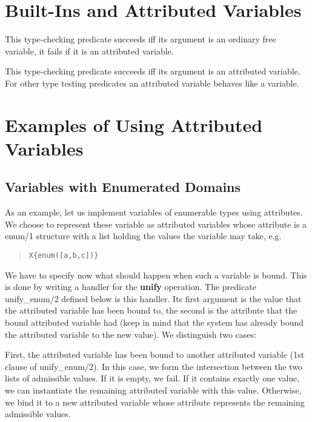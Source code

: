 \section{Built-Ins and Attributed Variables}
\begin{description}
\item[free(?Term)]
This type-checking predicate succeeds iff its argument is an
ordinary free variable, it fails if it is an attributed variable.

\item[meta(?Term)]
This type-checking predicate succeeds iff its argument is an attributed variable.
For other type testing predicates an attributed variable behaves like a variable.

\end{description}

\section{Examples of Using Attributed Variables}
\subsection{Variables with Enumerated Domains}
As an example, let us implement variables of enumerable types
using attributes.
We choose to represent these variable as attributed variables
whose attribute is
a enum/1 structure with a list holding the values the variable may take,
e.g.
\begin{quote}\begin{verbatim}
X{enum([a,b,c])}
\end{verbatim}\end{quote}

We have to specify now what should happen when such a variable is
bound. This is done by writing a handler for the {\bf unify} operation.
The predicate unify_enum/2 defined below is this
handler.
Its first argument is the value that the attributed variable has been bound to,
the second is the attribute that the bound attributed variable had
(keep in mind that the system has already bound the attributed variable to the
new value).  We distinguish two cases:

First, the attributed variable has been
bound to another attributed variable (1st clause of unify_enum/2).
In this case, we form the intersection between the two lists
of admissible values. If it is empty, we fail.
If it contains exactly one value, we can instantiate the remaining
attributed variable with this value.
Otherwise, we bind it to a new attributed variable whose attribute represents
the remaining admissible values.

